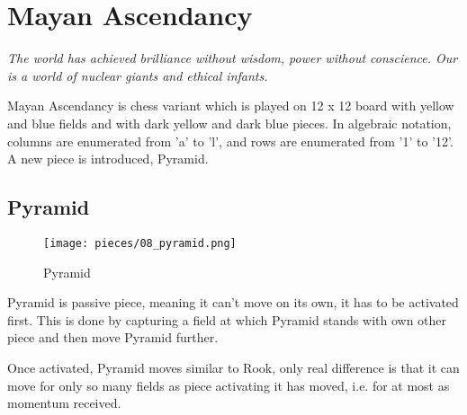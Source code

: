 

\chapter*{Mayan Ascendancy}
\label{ch:Mayan Ascendancy}

\begin{flushright}
\parbox{0.8\textwidth}{
\emph{The world has achieved brilliance without wisdom, power without
conscience. Our is a world of nuclear giants and ethical infants. \\
 } }
\end{flushright}

\noindent
Mayan Ascendancy is chess variant which is played on 12 x 12 board with
yellow and blue fields and with dark yellow and dark blue pieces. In
algebraic notation, columns are enumerated from 'a' to 'l', and rows are
enumerated from '1' to '12'. A new piece is introduced, Pyramid.

\clearpage %

\section*{Pyramid}
\label{sec:Mayan Ascendancy/Pyramid}

\noindent
\begin{wrapfigure}[12]{l}{0.4\textwidth}
\centering
\texttt{[image: pieces/08\_pyramid.png]}
\caption{Pyramid}
\label{fig:08_pyramid}
\end{wrapfigure}
Pyramid is passive piece, meaning it can't move on its own, it has to be
activated first. This is done by capturing a field at which Pyramid stands
with own other piece and then move Pyramid further.

Once activated, Pyramid moves similar to Rook, only real difference is that
it can move for only so many fields as piece activating it has moved, i.e.
for at most as momentum received.

